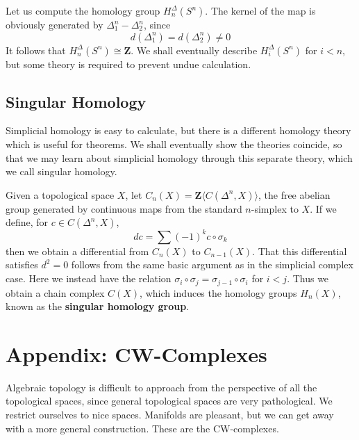 \begin{example}
    Let us compute the homology group $H^\Delta_n(S^n)$. The kernel of the map is obviously generated by $\Delta^n_1 - \Delta^n_2$, since
    \[ d(\Delta^n_1) = d(\Delta^n_2) \neq 0 \]
    It follows that $H^\Delta_n(S^n) \cong \mathbf{Z}$. We shall eventually describe $H^\Delta_i(S^n)$ for $i < n$, but some theory is required to prevent undue calculation.
\end{example}

\section{Singular Homology}

Simplicial homology is easy to calculate, but there is a different homology theory which is useful for theorems. We shall eventually show the theories coincide, so that we may learn about simplicial homology through this separate theory, which we call singular homology.

Given a topological space $X$, let $C_n(X) = \mathbf{Z}\langle C(\Delta^n, X) \rangle$, the free abelian group generated by continuous maps from the standard $n$-simplex to $X$. If we define, for $c \in C(\Delta^n, X)$,
%
\[ dc = \sum (-1)^k c \circ \sigma_k \]
%
then we obtain a differential from $C_n(X)$ to $C_{n-1}(X)$. That this differential satisfies $d^2 = 0$ follows from the same basic argument as in the simplicial complex case. Here we instead have the relation $\sigma_i \circ \sigma_j = \sigma_{j-1} \circ \sigma_i$ for $i < j$. Thus we obtain a chain complex $C(X)$, which induces the homology groups $H_n(X)$, known as the {\bf singular homology group}.








\chapter{Appendix: CW-Complexes}

Algebraic topology is difficult to approach from the perspective of all the topological spaces, since general topological spaces are very pathological. We restrict ourselves to nice spaces. Manifolds are pleasant, but we can get away with a more general construction. These are the CW-complexes.

